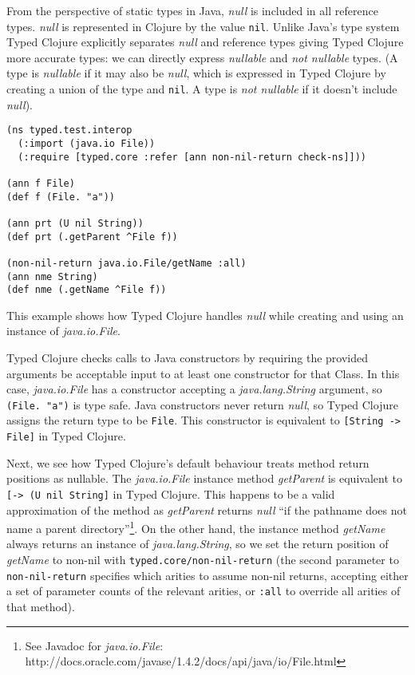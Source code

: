 From the perspective of static types in Java, \emph{null} is included in all reference types.
\emph{null} is represented in Clojure by the value \lstinline|nil|. Unlike Java's type system
Typed Clojure explicitly separates \emph{null} and reference types giving Typed Clojure 
more accurate types: we can directly express \emph{nullable} and \emph{not nullable} types.
(A type is \emph{nullable} if it may also be \emph{null},
which is expressed in Typed Clojure by creating a union of the type and \lstinline|nil|.
A type is \emph{not nullable} if it doesn't include \emph{null}).

\begin{lstlisting}[caption=Java interoperability with Typed Clojure]
(ns typed.test.interop
  (:import (java.io File))
  (:require [typed.core :refer [ann non-nil-return check-ns]]))

(ann f File)
(def f (File. "a"))

(ann prt (U nil String))
(def prt (.getParent ^File f))

(non-nil-return java.io.File/getName :all)
(ann nme String)
(def nme (.getName ^File f))

\end{lstlisting}

This example shows how Typed Clojure handles \emph{null} while creating and
using an instance of \emph{java.io.File}.

Typed Clojure checks calls to Java constructors by requiring the provided
arguments be acceptable input to at least one constructor for that Class.
In this case, \emph{java.io.File} has a constructor accepting a \emph{java.lang.String}
argument, so \lstinline|(File. "a")| is type safe. Java constructors never
return \emph{null}, so Typed Clojure assigns the return type to be \lstinline|File|.
This constructor is equivalent to \lstinline|[String -> File]| in Typed Clojure.

Next, we see how Typed Clojure's default behaviour treats method return positions as nullable.
The \emph{java.io.File} instance method \emph{getParent}
is equivalent to \lstinline|[-> (U nil String]| in Typed Clojure. This happens to be
a valid approximation of the method as \emph{getParent} returns \emph{null} 
``if the pathname does not name a parent directory''\footnote{See Javadoc for \emph{java.io.File}: http://docs.oracle.com/javase/1.4.2/docs/api/java/io/File.html}.
On the other hand, the instance method \emph{getName} always returns an
instance of \emph{java.lang.String}, so we set the return position of
\emph{getName} to non-nil with \lstinline|typed.core/non-nil-return|
(the second parameter to \lstinline|non-nil-return| specifies which arities to assume non-nil 
returns, accepting either a set of parameter counts of the relevant arities, or \lstinline|:all|
to override all arities of that method).

